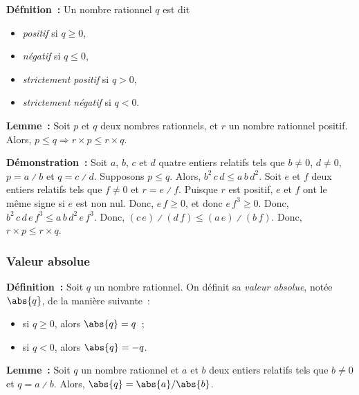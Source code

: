     \done

\medskip

\noindent\textbf{Défnition :} Un nombre rationnel $q$ est dit
    \begin{itemize}[nosep]
        \item \emph{positif} si $q \geq 0$,
        \item \emph{négatif} si $q \leq 0$,
        \item \emph{strictement positif} si $q > 0$,
        \item \emph{strictement négatif} si $q < 0$.
    \end{itemize}

\medskip

\noindent\textbf{Lemme :} Soit $p$ et $q$ deux nombres rationnels, et $r$ un nombre rationnel positif. 
    Alors, $p \leq q \Rightarrow r \times p \leq r \times q$.

\medskip

\noindent\textbf{Démonstration :}
    Soit $a$, $b$, $c$ et $d$ quatre entiers relatifs tels que $b \neq 0$, $d \neq 0$, $p = a \divslash b$ et $q = c \divslash d$.
    Supposons $p \leq q$.
    Alors, $b^2 \, c \, d \leq a \, b \, d^2$.
    Soit $e$ et $f$ deux entiers relatifs tels que $f \neq 0$ et $r = e \divslash f$.
    Puisque $r$ est positif, $e$ et $f$ ont le même signe si $e$ est non nul. 
    Donc, $e \, f \geq 0$, et donc $e \, f^3 \geq 0$.
    Donc, $b^2 \, c \, d \, e \, f^3 \leq a \, b \, d^2 \, e \, f^3$. 
    Donc, $(c \, e) \divslash (d \, f) \leq (a \, e) \divslash (b \, f)$. 
    Donc, $r \times p \leq r \times q$.

    \done

\subsubsection{Valeur absolue}

\noindent\textbf{Définition :} Soit $q$ un nombre rationnel. 
    On définit sa \emph{valeur absolue}, notée $\abs{q}$, de la manière suivante : 
    \begin{itemize}[nosep]
        \item si $q \geq 0$, alors $\abs{q} = q$ ; 
        \item si $q < 0$, alors $\abs{q} = -q$.
    \end{itemize}

\medskip

\noindent\textbf{Lemme :} Soit $q$ un nombre rationnel et $a$ et $b$ deux entiers relatifs tels que $b \neq 0$ et $q = a \divslash b$.
    Alors, $\abs{q} = \abs{a} / \abs{b}$.

